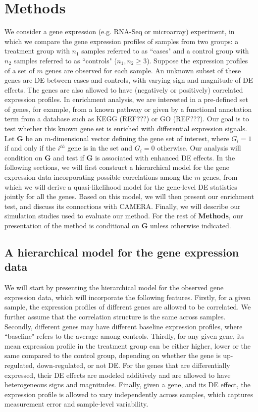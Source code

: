 \documentclass[useAMS,usenatbib, galley]{biom}
\begin{document}
	\section{Methods}\label{section:methods}
	We consider a gene expression (e.g. RNA-Seq or microarray) experiment, in which we compare the gene expression profiles of samples from two groups: a treatment group with $n_1$ samples referred to as ``cases" and a control group with $n_2$ samples referred to as ``controls" ($n_1,n_2\ge 3$). Suppose the expression profiles of a set of $m$ genes are observed for each sample. An unknown subset of these genes are DE between cases and controls, with varying sign and magnitude of DE effects. The genes are also allowed to have (negatively or positively) correlated expression profiles. In enrichment analysis, we are interested in a pre-defined set of genes, for example, from a known pathway or given by a functional annotation term from a database such as KEGG (REF???) or GO (REF???). Our goal is to test whether this known gene set is enriched with differential expression signals. Let $\bm G$ be an $m$-dimensional vector defining the gene set of interest, where $G_i=1$ if and only if the $i^{th}$ gene is in the set and $G_i=0$ otherwise. Our analysis will condition on $\bm G$ and test if $\bm G$ is associated with enhanced DE effects. In the following sections, we will first construct a hierarchical model for the gene expression data incorporating possible correlations among the $m$ genes, from which we will derive a quasi-likelihood model for the gene-level DE statistics jointly for all the genes. Based on this model, we will then present our enrichment test, and discuss its connections with CAMERA. Finally, we will describe our simulation studies used to evaluate our method. For the rest of \textbf{Methods}, our presentation of the method is conditional on $\bm G$ unless otherwise indicated.
	
	\subsection{A hierarchical model for the gene expression data}\label{subsection:YModel}
	We will start by presenting the hierarchical model for the observed gene expression data, which will incorporate the following features. 
	Firstly, for a given sample, the expression profiles of different genes are allowed to be correlated. We further assume that the correlation structure is the same across samples. Secondly, different genes may have different baseline expression profiles, where ``baseline" refers to the average among controls. Thirdly, for any given gene, its mean expression profile in the treatment group can be either higher, lower or the same compared to the control group, depending on whether the gene is up-regulated, down-regulated, or not DE. For the genes that are differentially expressed, their DE effects are modeled additively and are allowed to have heterogeneous signs and magnitudes. Finally, given a gene, and its DE effect, the expression profile is allowed to vary independently across samples, which captures measurement error and sample-level variability.
	
\end{document}
